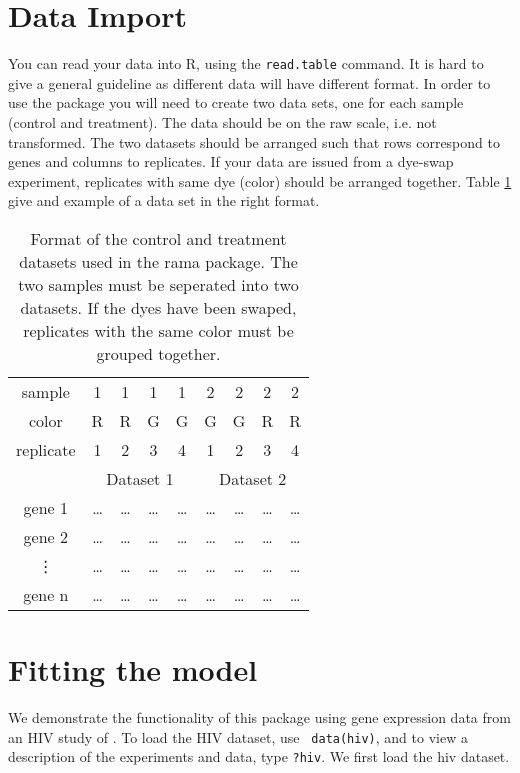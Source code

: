 \documentclass[11pt]{article}
\begin{document}
\section{Data Import}

You can read your data into R,  using the {\tt read.table} command. 
It is hard to give a general guideline as different data will have different format. In order to use the package you will need 
to create two data sets, one for each sample (control and treatment). The data should be on the raw scale, i.e. not transformed. 
The two datasets should be arranged such that rows correspond to genes and columns to replicates. 
If your data are issued from a dye-swap experiment, replicates with same dye (color) should be arranged together. 
Table \ref{tab:data_format} give and example of a data set in the right format. 

\begin{table}[htbp]
  \caption{Format of the control and treatment datasets used in the rama package. 
    The two samples must be seperated into two datasets. If the dyes have been swaped, replicates
    with the same color must be grouped together.}
  \centering
  \begin{tabular}{ccccccccc}\hline \hline
    sample & 1 & 1 & 1 & 1 & 2 & 2 & 2 & 2  \\
    color & R & R & G & G & G & G & R & R \\
    replicate & 1 & 2 & 3 & 4 & 1 & 2 & 3 & 4 \\ \hline
    & \multicolumn{4}{c}{Dataset 1} & \multicolumn{4}{c}{Dataset 2} \\ \cline{2-5} \cline{6-9}
    gene 1 &  \dots & \dots & \dots & \dots & \dots & \dots & \dots & \dots \\
    gene 2 &  \dots  & \dots & \dots & \dots & \dots & \dots & \dots & \dots \\ 
    \vdots &  \dots  & \dots & \dots & \dots & \dots & \dots & \dots & \dots \\ 
    gene n &  \dots  & \dots & \dots & \dots & \dots & \dots & \dots & \dots \\ \hline
  \end{tabular}
  \label{tab:data_format}
\end{table}


\section{Fitting the model} 


We demonstrate the functionality of this package using gene
 expression data from an HIV study of . 
 To load the HIV dataset, use {\tt
   data(hiv)}, and to view a description of the experiments and
 data, type {\tt ?hiv}. We first load the hiv dataset.  
\end{document}

